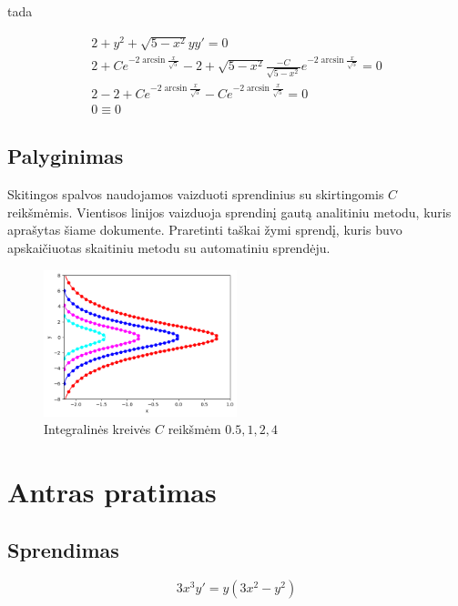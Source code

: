 \documentclass[11pt]{article}
\begin{document}
tada

\begin{equation}
    \begin{split}
        2+y^2+\sqrt{5-x^2}yy'=0\\
        2+Ce^{-2\arcsin{\frac{x}{\sqrt{5}}}} - 2+\sqrt{5-x^2}\frac{-C}{\sqrt{5-x^2}}e^{-2\arcsin{\frac{x}{\sqrt{5}}}}=0\\
        2-2+Ce^{-2\arcsin{\frac{x}{\sqrt{5}}}}-Ce^{-2\arcsin{\frac{x}{\sqrt{5}}}}=0\\
        0\equiv0
    \end{split}
\end{equation}

\subsection{Palyginimas}

Skitingos spalvos naudojamos vaizduoti sprendinius su skirtingomis $C$ reikšmėmis.
Vientisos linijos vaizduoja sprendinį gautą analitiniu metodu, kuris aprašytas šiame dokumente.
Praretinti taškai žymi sprendį, kuris buvo apskaičiuotas skaitiniu metodu su automatiniu sprendėju.

\begin{figure}[h!]
    \centering
    \includegraphics[width=0.5\textwidth]{1.png}
    \caption{Integralinės kreivės $C$ reikšmėm $0.5, 1, 2, 4$}
    \label{fig:pvz1}
\end{figure}

\newpage
\section{Antras pratimas}

\subsection{Sprendimas}

\begin{equation}
    3x^3y'=y(3x^2-y^2)
\end{equation}
\end{document}
